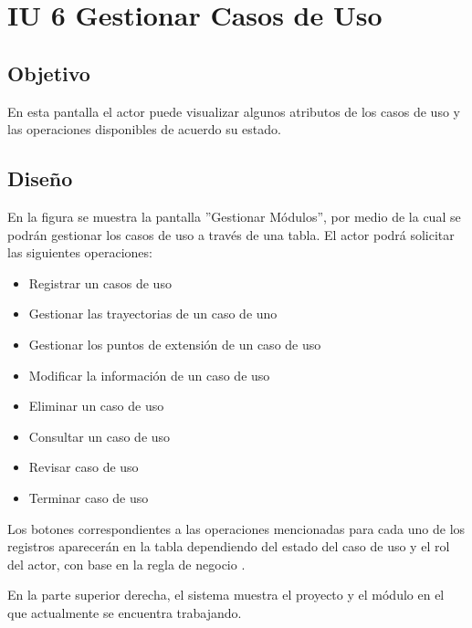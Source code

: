 \section{IU 6 Gestionar Casos de Uso}

\subsection{Objetivo}
	En esta pantalla el actor puede visualizar algunos atributos de los casos de uso y las operaciones disponibles de acuerdo su estado.
\subsection{Diseño}
	En la figura  se muestra la pantalla ''Gestionar Módulos'', por medio de la cual se podrán gestionar los casos de uso a través de una tabla. El actor podrá solicitar las siguientes operaciones:
	\begin{itemize}
		\item Registrar un casos de uso
		\item Gestionar las trayectorias de un caso de uno
		\item Gestionar los puntos de extensión de un caso de uso
		\item Modificar la información de un caso de uso
		\item Eliminar un caso de uso
		\item Consultar un caso de uso
		\item Revisar caso de uso
		\item Terminar caso de uso
	\end{itemize}

Los botones correspondientes a las operaciones mencionadas para cada uno de los registros aparecerán en la tabla dependiendo del estado del caso de uso y el rol del actor, con base en la regla de negocio .

En la parte superior derecha, el sistema muestra el proyecto y el módulo en el que actualmente se encuentra trabajando.
\label{IU6}
